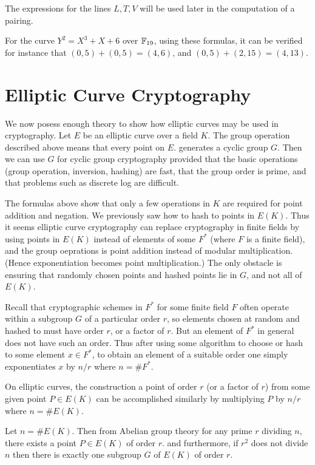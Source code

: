 The expressions for the lines $L,T,V$ will be used later in the computation
of a pairing.

For the curve $Y^2 = X^3 + X + 6$ over $\mathbb{F}_{19}$,
using these formulas, it can be verified for instance that
$(0, 5) + (0, 5) = (4, 6)$,
and $(0, 5) + (2, 15) = (4, 13)$.

\section {Elliptic Curve Cryptography}

We now posess enough theory to show how elliptic curves may be used
in cryptography.
Let $E$ be an elliptic curve over a field $K$.
The group operation described above means that every point on $E$.
generates a cyclic group $G$.
Then we can use $G$ for cyclic group cryptography
provided that the basic operations (group operation, inversion, hashing) are
fast, that the group order is prime,
and that problems such as discrete log are difficult.

The formulas above show that only a few operations in $K$ are required for
point addition and negation.
We previously saw how to hash to points in $E(K)$.
Thus it seems elliptic curve cryptography can replace
cryptography in finite fields by using
points in $E(K)$ instead of elements of some $F^*$ (where $F$ is a
finite field), and the group oeprations is
point addition instead of modular multiplication. (Hence
exponentiation becomes point multiplication.)
The only obstacle is ensuring that randomly chosen points and hashed points
lie in $G$, and not all of $E(K)$.

Recall that cryptographic schemes in $F^*$ for some finite field $F$
often operate within a subgroup $G$ of a particular order $r$,
so elements chosen at random and hashed to must have
order $r$, or a factor of $r$. But an element of $F^*$
in general does not have such an order.
Thus after using some algorithm to
choose or hash to some element $x \in F^*$,
to obtain an element of a suitable order one simply exponentiates $x$
by $n / r$ where $n = \#F^*$.

On elliptic curves, the construction a point of order $r$ (or a factor of $r$)
from some given point $P \in E(K)$ can be accomplished similarly
by multiplying $P$ by
$n / r$ where $n = \#E(K)$.

Let $n = \#E(K)$. Then from Abelian group theory
for any prime $r$ dividing $n$,
there exists a point $P \in E(K)$ of order $r$.
and furthermore, if $r^2$ does not divide $n$ then there is exactly one
subgroup $G$ of $E(K)$ of order $r$.

